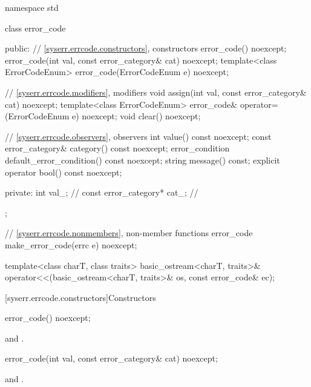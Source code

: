 %
\begin{codeblock}
namespace std {
  class error_code {
  public:
    // \ref{syserr.errcode.constructors}, constructors
    error_code() noexcept;
    error_code(int val, const error_category& cat) noexcept;
    template<class ErrorCodeEnum>
      error_code(ErrorCodeEnum e) noexcept;

    // \ref{syserr.errcode.modifiers}, modifiers
    void assign(int val, const error_category& cat) noexcept;
    template<class ErrorCodeEnum>
      error_code& operator=(ErrorCodeEnum e) noexcept;
    void clear() noexcept;

    // \ref{syserr.errcode.observers}, observers
    int value() const noexcept;
    const error_category& category() const noexcept;
    error_condition default_error_condition() const noexcept;
    string message() const;
    explicit operator bool() const noexcept;

  private:
    int val_;                   // \expos
    const error_category* cat_; // \expos
  };

  // \ref{syserr.errcode.nonmembers}, non-member functions
  error_code make_error_code(errc e) noexcept;

  template<class charT, class traits>
    basic_ostream<charT, traits>&
      operator<<(basic_ostream<charT, traits>& os, const error_code& ec);
}
\end{codeblock}

[syserr.errcode.constructors]{Constructors}

%
\begin{itemdecl}
error_code() noexcept;
\end{itemdecl}

\begin{itemdescr}

\pnum
\ensures {} and .
\end{itemdescr}

%
\begin{itemdecl}
error_code(int val, const error_category& cat) noexcept;
\end{itemdecl}

\begin{itemdescr}

\pnum
\ensures {} and .
\end{itemdescr}


